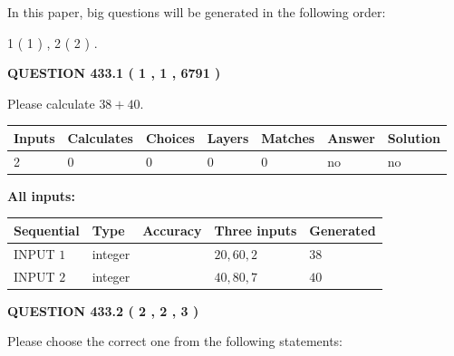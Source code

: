 \documentclass[12pt]{article}
\begin{document}
\vspace{0.2in}
   
In this paper, big questions will be generated in the following order: 
   
   
   1 ( 1 )
 ,
   2 ( 2 )
 .
  
\vspace{0.2in}
  
{\textbf{\Large{QUESTION
433.1 
 ( 1 , 1 , 6791 )
}}}
  
  
 
Please calculate $ %
38 +  %
40 $.
 
 
   
   
   
   
\noindent\begin{tabular}{|l|l|l|l|l|l|l|}
 \hline
Inputs & Calculates & Choices & Layers & Matches & Answer & Solution \\ \hline
 2  & 
 0  & 
 0
  & 
 0  & 
 0  & 
  no & 
  no 
  \\ \hline
 \end{tabular}
   
   
   
   
\noindent{}
   
   
   
   
\noindent\vspace{0.1in}\hspace{-0.08in} {\textbf{\Large{All inputs: }}}
   
   
  
  
\noindent\begin{tabular}{|l|l|l|l|l|}
\hline
 Sequential & Type & Accuracy & Three inputs & Generated \\ 
\hline
 
 
  INPUT $  1 $ & integer &  & $
 20
 , 
 60
 , 
 2
 $ & $ 38 $ 
 \\  \hline  
 
 
  INPUT $  2 $ & integer &  & $
 40
 , 
 80
 , 
 7
 $ & $ 40 $ 
 \\  \hline  
 \end{tabular}
   
   
  
\vspace{0.2in}
  
{\textbf{\Large{QUESTION
433.2 
 ( 2 , 2 , 3 )
}}}
  
  
Please choose the correct one from the following statements:
 
\end{document}
